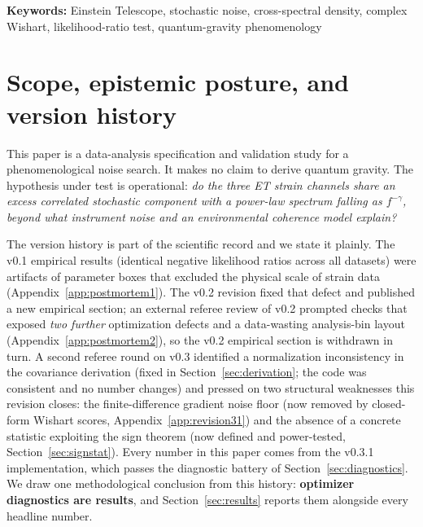 \documentclass[11pt]{article}
\begin{document}
\begin{abstract}
limit by twice the amplitude-calibration uncertainty at most. We retain the forecast, the existing-bounds comparison distinguishing the strain-noise and path-length-noise readings (under the latter, the paper's own Planck mapping implies short-baseline experiments already constrain the benchmark to $\alpha \lesssim 10^{-7}$, so the ET case rests on the strain reading), the stochastic-background confusion analysis, and the pre-declared detection rule, now a two-channel coincidence. All code, data manifests, validation logs, and all post-mortems are public.
\end{abstract}

\noindent\textbf{Keywords:} Einstein Telescope, stochastic noise, cross-spectral density, complex Wishart, likelihood-ratio test, quantum-gravity phenomenology

\section{Scope, epistemic posture, and version history}
\label{sec:scope}

This paper is a data-analysis specification and validation study for a phenomenological noise search. It makes no claim to derive quantum gravity. The hypothesis under test is operational: \emph{do the three ET strain channels share an excess correlated stochastic component with a power-law spectrum falling as $f^{-\gamma}$, beyond what instrument noise and an environmental coherence model explain?}

The version history is part of the scientific record and we state it plainly. The v0.1 empirical results (identical negative likelihood ratios across all datasets) were artifacts of parameter boxes that excluded the physical scale of strain data (Appendix~\ref{app:postmortem1}). The v0.2 revision fixed that defect and published a new empirical section; an external referee review of v0.2 prompted checks that exposed \emph{two further} optimization defects and a data-wasting analysis-bin layout (Appendix~\ref{app:postmortem2}), so the v0.2 empirical section is withdrawn in turn. A second referee round on v0.3 identified a normalization inconsistency in the covariance derivation (fixed in Section~\ref{sec:derivation}; the code was consistent and no number changes) and pressed on two structural weaknesses this revision closes: the finite-difference gradient noise floor (now removed by closed-form Wishart scores, Appendix~\ref{app:revision31}) and the absence of a concrete statistic exploiting the sign theorem (now defined and power-tested, Section~\ref{sec:signstat}). Every number in this paper comes from the v0.3.1 implementation, which passes the diagnostic battery of Section~\ref{sec:diagnostics}. We draw one methodological conclusion from this history: \textbf{optimizer diagnostics are results}, and Section~\ref{sec:results} reports them alongside every headline number.
\end{document}
